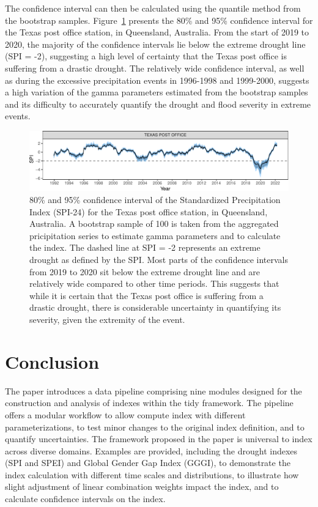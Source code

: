 \documentclass[
]{interact}
\begin{document}
The confidence interval can then be calculated using the quantile method
from the bootstrap samples. Figure~\ref{fig-conf-interval} presents the
80\% and 95\% confidence interval for the Texas post office station, in
Queensland, Australia. From the start of 2019 to 2020, the majority of
the confidence intervals lie below the extreme drought line (SPI = -2),
suggesting a high level of certainty that the Texas post office is
suffering from a drastic drought. The relatively wide confidence
interval, as well as during the excessive precipitation events in
1996-1998 and 1999-2000, suggests a high variation of the gamma
parameters estimated from the bootstrap samples and its difficulty to
accurately quantify the drought and flood severity in extreme events.

\begin{figure}

{\centering \includegraphics{tidyindex_files/figure-pdf/fig-conf-interval-1.pdf}

}

\caption{\label{fig-conf-interval}80\% and 95\% confidence interval of
the Standardized Precipitation Index (SPI-24) for the Texas post office
station, in Queensland, Australia. A bootstrap sample of 100 is taken
from the aggregated pricipitation series to estimate gamma parameters
and to calculate the index. The dashed line at SPI = -2 represents an
extreme drought as defined by the SPI. Most parts of the confidence
intervals from 2019 to 2020 sit below the extreme drought line and are
relatively wide compared to other time periods. This suggests that while
it is certain that the Texas post office is suffering from a drastic
drought, there is considerable uncertainty in quantifying its severity,
given the extremity of the event.}

\end{figure}

\hypertarget{conclusion}{%
\section{Conclusion}\label{conclusion}}

The paper introduces a data pipeline comprising nine modules designed
for the construction and analysis of indexes within the tidy framework.
The pipeline offers a modular workflow to allow compute index with
different parameterizations, to test minor changes to the original index
definition, and to quantify uncertainties. The framework proposed in the
paper is universal to index across diverse domains. Examples are
provided, including the drought indexes (SPI and SPEI) and Global Gender
Gap Index (GGGI), to demonstrate the index calculation with different
time scales and distributions, to illustrate how slight adjustment of
linear combination weights impact the index, and to calculate confidence
intervals on the index.
\end{document}
